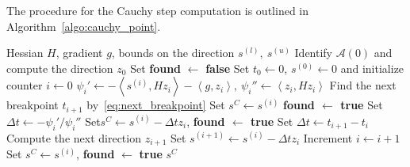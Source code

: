 \documentclass{article}
\numberwithin{equation}{section}
\newcommand{\calA}{{\mathcal{A}}}
\newcommand{\inner}[2]{\left\langle {#1} , {#2} \right\rangle} %
\theoremstyle{plain}
\begin{document}
	The procedure for the Cauchy step computation is outlined in Algorithm~\ref{algo:cauchy_point}.
	\begin{algorithm}
		\caption{Cauchy step computation}\label{algo:cauchy_point}
		\begin{algorithmic}[1]
			\Require Hessian $H$, gradient $g$, bounds on the direction $s^{(l)},\ s^{(u)}$
			\State Identify $\calA(0)$ and compute the direction $z_0$
			\State Set \textbf{found} $\gets$ \textbf{false} 
			\State Set $t_0\gets 0$, $s^{(0)}\gets 0$ and initialize counter $i\gets 0$
			\Repeat
			\State $\psi_i' \gets -\inner{s^{(i)}}{Hz_i}-\inner{g}{z_i},\ \psi_i'' \gets \inner{z_i}{Hz_i}$
			\State Find the next breakpoint $t_{i+1}$ by~\eqref{eq:next_breakpoint}
			\State Set $s^C \gets s^{(i)}$
			\State \textbf{found $\gets$ \textbf{true}}
			\State Set $\Delta t \gets - \psi_i'/\psi_i''$
			\State Set$s^C \gets s^{(i)} - \Delta t z_i$, \textbf{found $\gets$ \textbf{true}}
			\Else
			\State Set $\Delta t \gets t_{i+1}-t_i$
			\State Compute the next direction $z_{i+1}$
			\State Set $s^{(i+1)} \gets s^{(i)} - \Delta t z_i$
			\EndIf
			\State Increment $i \gets i+1$
			\If{$|\calA(t_i)| = n-m$}
			\State Set $s^C \gets s^{(i)}$, \textbf{found} $\gets$ \textbf{true}
			\EndIf
			\State \Return $s^C$
		\end{algorithmic}
	\end{algorithm}
				
				
			
\end{document}
